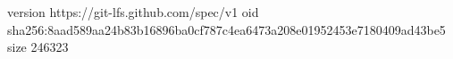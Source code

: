 version https://git-lfs.github.com/spec/v1
oid sha256:8aad589aa24b83b16896ba0cf787c4ea6473a208e01952453e7180409ad43be5
size 246323
